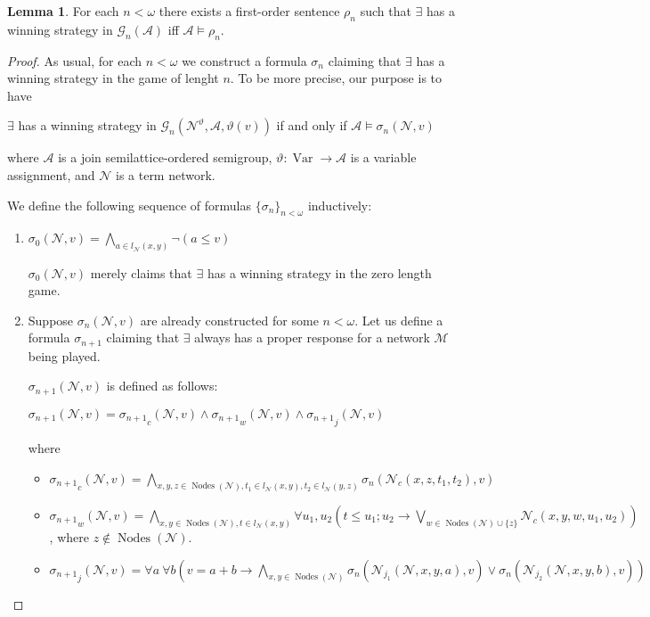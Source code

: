 \documentclass[a4paper]{article}
\theoremstyle{definition}
\theoremstyle{theorem}
\theoremstyle{proposition}
\theoremstyle{lemma}
\newtheorem{lemma}{Lemma}
\theoremstyle{ex}
\theoremstyle{corollary}
\theoremstyle{claim}
\begin{document}
\begin{lemma}\label{ax}
  For each $n < \omega$ there exists a first-order sentence $\rho_n$ such that $\exists$ has a winning strategy in $\mathcal{G}_n(\mathcal{A})$ iff $\mathcal{A} \models \rho_n$.
\end{lemma}

\begin{proof}
  As usual, for each $n < \omega$ we construct a formula $\sigma_n$ claiming that $\exists$ has a winning strategy in the game of lenght $n$. To be more precise, our purpose is to have
  \begin{center}
    $\exists$ has a winning strategy in $\mathcal{G}_n(\mathcal{N}^{\vartheta}, \mathcal{A}, \vartheta(v))$ if and only if $\mathcal{A} \models \sigma_{n}(\mathcal{N}, v)$
  \end{center}
  where $\mathcal{A}$ is a join semilattice-ordered semigroup, $\vartheta : \operatorname{Var} \to \mathcal{A}$ is a variable assignment, and $\mathcal{N}$ is a term network.

  We define the following sequence of formulas $\{ \sigma_n \}_{n < \omega}$ inductively:
  \begin{enumerate}
    \item $\sigma_0(\mathcal{N}, v) = \bigwedge \limits_{a \in l_{\mathcal{N}}(x, y)} \neg (a \leq v)$

$\sigma_0(\mathcal{N}, v)$ merely claims that $\exists$ has a winning strategy in the zero length game.
    \item Suppose $\sigma_{n}(\mathcal{N}, v)$ are already constructed for some $n < \omega$. Let us define a formula $\sigma_{n + 1}$ claiming that $\exists$ always has a proper response for a network $\mathcal{M}$ being played.

    $\sigma_{n + 1}(\mathcal{N}, v)$ is defined as follows:
    \begin{center}
      $\sigma_{n + 1}(\mathcal{N}, v) = {\sigma_{n + 1}}_c(\mathcal{N}, v) \land {\sigma_{n + 1}}_w(\mathcal{N}, v) \land {\sigma_{n + 1}}_j(\mathcal{N}, v)$
    \end{center}
    where
    \begin{itemize}
      \item ${\sigma_{n + 1}}_c(\mathcal{N}, v) = \bigwedge \limits_{x, y, z \in \operatorname{Nodes}(\mathcal{N}), t_1 \in l_{\mathcal{N}}(x, y), t_2 \in l_{\mathcal{N}}(y, z)} \sigma_{n}(\mathcal{N}_c(x, z, t_1, t_2), v)$
      \item ${\sigma_{n + 1}}_w(\mathcal{N}, v) = \bigwedge \limits_{x,y \in \operatorname{Nodes}(\mathcal{N}), t \in l_{\mathcal{N}}(x,y)} \forall u_1, u_2 (t \leq u_1 ; u_2 \rightarrow \bigvee \limits_{w \in \operatorname{Nodes}(\mathcal{N}) \cup \{ z \}} \mathcal{N}_c(x,y,w, u_1, u_2))$, where $z \notin \operatorname{Nodes}(\mathcal{N})$.
      \item ${\sigma_{n + 1}}_j(\mathcal{N}, v) = \forall a \: \forall b (v = a + b \rightarrow \bigwedge \limits_{x, y \in \operatorname{Nodes}(\mathcal{N})} \sigma_{n}(\mathcal{N}_{j_1}(\mathcal{N}, x, y, a), v) \lor \sigma_{n}(\mathcal{N}_{j_2}(\mathcal{N}, x, y, b), v))$
    \end{itemize}
  \end{enumerate}


\end{proof}
\end{document}
